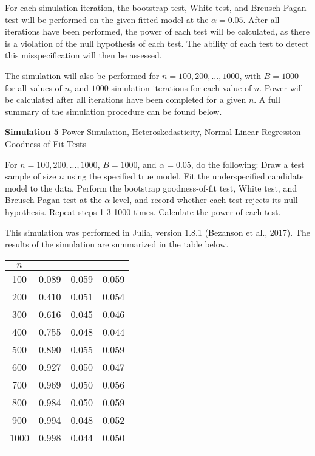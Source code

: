 		For each simulation iteration, the bootstrap test, White test, and Breusch-Pagan test will be performed on the given fitted model at the $\alpha = 0.05$. After all iterations have been
		performed, the power of each test will be calculated, as there is a violation of the null hypothesis of each test. The ability of each test to detect this misspecification will
		then be assessed.

		The simulation will also be performed for $n = 100,200,...,1000$, with $B = 1000$ for all values of $n$, and $1000$ simulation iterations for each value of $n$. 
		Power will be calculated after all iterations have been completed for a given $n$. A full summary of the simulation procedure can be found below.
		\begin{algorithm}[H]
			\caption*{\textbf{Simulation 5} Power Simulation, Heteroskedasticity, Normal Linear Regression Goodness-of-Fit Tests}
			\begin{algorithmic}[1]
			  \Statex For $n = 100,200,...,1000$, $B = 1000$, and $\alpha = 0.05$, do the following:
			  \State Draw a test sample of size $n$ using the specified true model.
			  \State Fit the underspecified candidate model to the data.
			  \State Perform the bootstrap goodness-of-fit test, White test, and Breusch-Pagan test at the $\alpha$ level,
			  and record whether each test rejects its null hypothesis.
			  \State Repeat steps 1-3 1000 times.
			  \State Calculate the power of each test.
			\end{algorithmic}
		\end{algorithm}

		This simulation was performed in Julia, version 1.8.1 (Bezanson et al., 2017). The results of the simulation are summarized in the table below.

		\begin{table}[H]
			\centering
			\small\addtolength{\tabcolsep}{-3pt}
			\setlength\extrarowheight{-3pt}
			{
			\begin{tabular}{ c|c|c|c}
			$n$ & \vtop{\hbox{\strut Bootstrap}\hbox{\strut Test}} & \vtop{\hbox{\strut White}\hbox{\strut Test}} & \vtop{\hbox{\strut Breusch-Pagan} \hbox{\strut Test}} \\
			 \hline
			 100 & 0.089 & 0.059 & 0.059 \\
			 200 & 0.410 & 0.051 & 0.054 \\
			 300 & 0.616 & 0.045 & 0.046 \\
			 400 & 0.755 & 0.048 & 0.044 \\
			 500 & 0.890 & 0.055 & 0.059 \\
			 600 & 0.927 & 0.050 & 0.047 \\
			 700 & 0.969 & 0.050 & 0.056 \\
			 800 & 0.984 & 0.050 & 0.059 \\
			 900 & 0.994 & 0.048 & 0.052 \\
			 1000 & 0.998 & 0.044 & 0.050 \\
			 
			 \Xhline{3\arrayrulewidth}
			\end{tabular}
			}
		\end{table}

